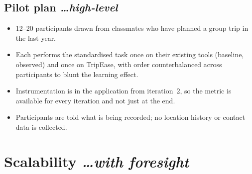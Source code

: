 \documentclass[11pt,a4paper]{article}
\newcommand{\BvrHint}[1]{%
  {\normalfont\normalsize\itshape\hfill #1}}
\begin{document}
\subsection{Pilot plan %
\BvrHint{\ldots high-level}}
\begin{itemize}[leftmargin=0.7cm]
    \item 12--20 participants drawn from classmates who
      have planned a group trip in the last year.
    \item Each performs the standardised task once on
      their existing tools (baseline, observed) and
      once on TripEase, with order counterbalanced
      across participants to blunt the learning effect.
    \item Instrumentation is in the application from
      iteration~2, so the metric is available for every
      iteration and not just at the end.
    \item Participants are told what is being recorded;
      no location history or contact data is collected.
\end{itemize}

\section{Scalability %
\BvrHint{\ldots with foresight}}
\end{document}
